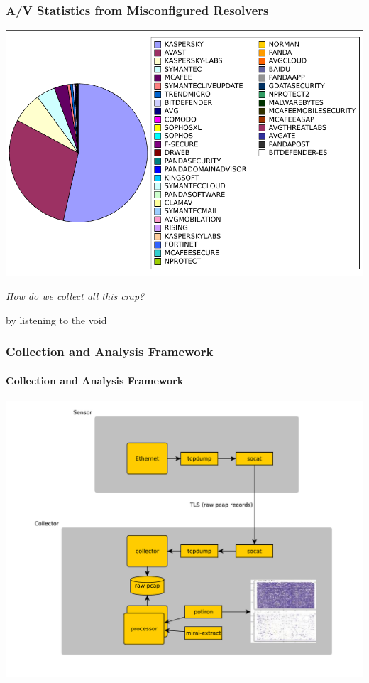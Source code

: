 \documentclass{beamer}
\begin{document}
\begin{frame}
\frametitle{A/V Statistics from Misconfigured Resolvers}
\includegraphics[scale=0.7]{av-stats.pdf}
\end{frame}


\begin{frame}
        {\center \it \Huge How do we collect all this crap?\\}
        \begin{flushright}
        by listening to the void
        \end{flushright}
\end{frame}


\begin{frame}
        \frametitle{Collection and Analysis Framework}
        \framesubtitle{Collection and Analysis Framework}
        \includegraphics[scale=0.29]{overview-sensor.pdf}
\end{frame}
\end{document}
